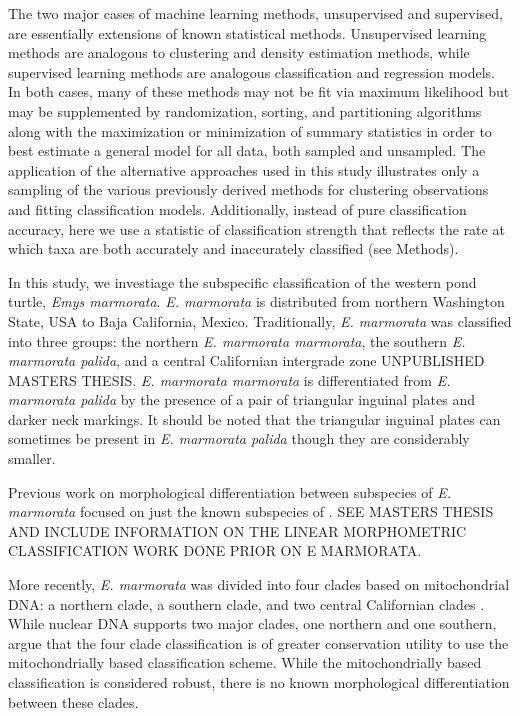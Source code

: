 \documentclass[12pt,letterpaper]{article}\usepackage{graphicx, color}
\begin{document}
The two major cases of machine learning methods, unsupervised and supervised, are essentially extensions of known statistical methods. Unsupervised learning methods are analogous to clustering and density estimation methods, while supervised learning methods are analogous classification and regression models. In both cases, many of these methods may not be fit via maximum likelihood but may be supplemented by randomization, sorting, and partitioning algorithms along with the maximization or minimization of summary statistics in order to best estimate a general model for all data, both sampled and unsampled. The application of the alternative approaches used in this study illustrates only a sampling of the various previously derived methods for clustering observations and fitting classification models. Additionally, instead of pure classification accuracy, here we use a statistic of classification strength that reflects the rate at which taxa are both accurately and inaccurately classified (see Methods).


In this study, we investiage the subspecific classification of the western pond turtle, \textit{Emys marmorata}. \textit{E. marmorata} is distributed from northern Washington State, USA to Baja California, Mexico.
Traditionally, \textit{E. marmorata} was classified into three groups: the northern \textit{E. marmorata marmorata}, the southern \textit{E. marmorata palida}, and a central Californian intergrade zone \citep{Seeliger1945} UNPUBLISHED MASTERS THESIS. \textit{E. marmorata marmorata} is differentiated from \textit{E. marmorata palida} by the presence of a pair of triangular inguinal plates and darker neck markings. It should be noted that the triangular inguinal plates can sometimes be present in \textit{E. marmorata palida} though they are considerably smaller.

Previous work on morphological differentiation between subspecies of \textit{E. marmorata} focused on just the known subspecies of \citet{Seeliger1945}. SEE MASTERS THESIS AND INCLUDE INFORMATION ON THE LINEAR MORPHOMETRIC CLASSIFICATION WORK DONE PRIOR ON E MARMORATA.

More recently, \textit{E. marmorata} was divided into four clades based on mitochondrial DNA: a northern clade, a southern clade, and two central Californian clades \citep{Spinks2005,Spinks2010}. While nuclear DNA supports two major clades, one northern and one southern, \citet{Spinks2010} argue that the four clade classification is of greater conservation utility to use the mitochondrially based classification scheme.
While the mitochondrially based classification is considered robust, there is no known morphological differentiation between these clades.
\end{document}
